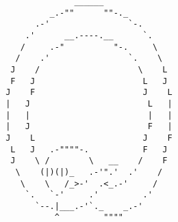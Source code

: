 \documentclass{article}
\begin{document}
\vfill
\centering
\small
\begin{BVerbatim}
               ______
          _.-""      ""-._
       .-'                `-.
     .'      __.----.__      `.
    /     .-"          "-.     \
   /    .'                `.    \
  J    /                    \    L
  F   J                      L   J
 J    F                      J    L
 |   J                        L   |
 |   |                        |   |
 |   J                        F   |
 J    L                      J    F
  L   J   .-""""-.           F   J
  J    \ /        \   __    /    F
   \    (|)(|)_   .-'".'  .'    /
    \    \   /_>-'  .<_.-'     /
     `.   `-'     .'         .'
       `--.|___.-'`._    _.-'
           ^         """"
\end{BVerbatim}
\end{document}
